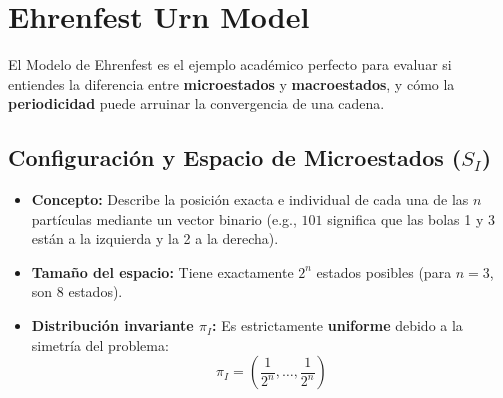 \documentclass[10pt]{book}
\begin{document}
\section{Ehrenfest Urn Model}

\noindent 
El Modelo de Ehrenfest es el ejemplo académico perfecto para evaluar si entiendes la diferencia entre \textbf{microestados} y \textbf{macroestados}, y cómo la \textbf{periodicidad} puede arruinar la convergencia de una cadena.

\subsection{Configuración y Espacio de Microestados ($S_I$)}
\begin{itemize}
    \item \textbf{Concepto:} Describe la posición exacta e individual de cada una de las $n$ partículas mediante un vector binario (e.g., $101$ significa que las bolas 1 y 3 están a la izquierda y la 2 a la derecha).
    \item \textbf{Tamaño del espacio:} Tiene exactamente $2^n$ estados posibles (para $n=3$, son $8$ estados).
    \item \textbf{Distribución invariante $\pi_I$:} Es estrictamente \textbf{uniforme} debido a la simetría del problema: 
    $$\pi_I = \left(\frac{1}{2^n}, \dots, \frac{1}{2^n}\right)$$
\end{itemize}
\end{document}
